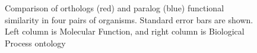 \begin{figure}
\begin{centering}
\par\end{centering}
\caption[Comparison of orthologs and paralogs in four pairs of organisms]{Comparison of orthologs (red) and paralog (blue) functional similarity in four pairs of organisms. Standard error bars are shown. Left column is Molecular Function, and right column is Biological Process ontology}
\label{fig:oc1}
\end{figure}

